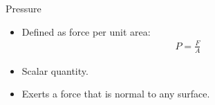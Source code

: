 \documentclass[aspectratio=169,
hyperref={colorlinks,urlcolor=blue}
]{beamer}
\begin{document}

\begin{frame}{Pressure}
\begin{itemize}
\item Defined as force per unit area:
\begin{align*}
P=\frac{F}{A}
\end{align*}
\item Scalar quantity.
\item Exerts a force that is normal to any surface.
\end{itemize}

\end{frame}




\end{document}
